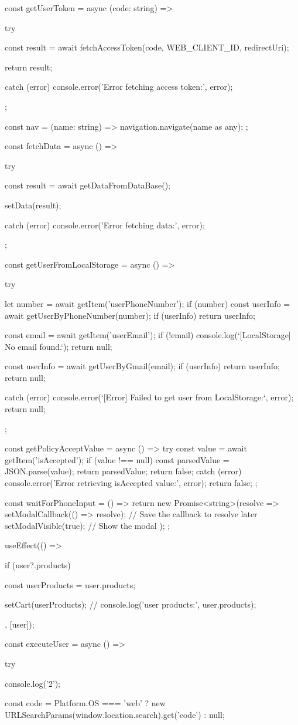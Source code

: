 {  const getUserToken = async (code: string) => {
    try {
      const result = await fetchAccessToken(code, WEB_CLIENT_ID, redirectUri);

      return result;
    } catch (error) {
      console.error('Error fetching access token:', error);
    }
  };

  const nav = (name: string) => {
    navigation.navigate(name as any);
  };

  const fetchData = async () => {
    try {
      const result = await getDataFromDataBase();

      setData(result);
    } catch (error) {
      console.error('Error fetching data:', error);
    }
  };

  const getUserFromLocalStorage = async () => {
    try {
      let number = await getItem('userPhoneNumber');
      if (number) {
        const userInfo = await getUserByPhoneNumber(number);
        if (userInfo) {
          return userInfo;
        }
      }

      const email = await getItem('userEmail');
      if (!email) {
        console.log(`[LocalStorage] No email found.`);
        return null;
      }

      const userInfo = await getUserByGmail(email);
      if (userInfo) {
        return userInfo;
      }
      return null;
    } catch (error) {
      console.error(`[Error] Failed to get user from LocalStorage:`, error);
      return null;
    }
  };

  const getPolicyAcceptValue = async () => {
    try {
      const value = await getItem('isAccepted');
      if (value !== null) {
        const parsedValue = JSON.parse(value);
        return parsedValue;
      }
      return false;
    } catch (error) {
      console.error('Error retrieving isAccepted value:', error);
      return false;
    }
  };

  const waitForPhoneInput = () => {
    return new Promise<string>(resolve => {
      setModalCallback(() => resolve); // Save the callback to resolve later
      setModalVisible(true); // Show the modal
    });
  };

  useEffect(() => {
    if (user?.products) {
      const userProducts = user.products;

      setCart(userProducts);
      // console.log('user products:', user.products);
    }
  }, [user]);

  const executeUser = async () => {
    try {
      console.log('2');

      const code =
        Platform.OS === 'web'
          ? new URLSearchParams(window.location.search).get('code')
          : null;

}}}
